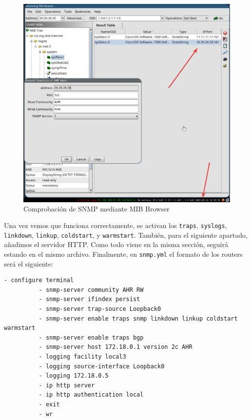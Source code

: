 \documentclass[11pt]{article}
\begin{document}
\begin{figure}[h]
    \centering
    \includegraphics[width=\textwidth]{src/snmpgets.png}
    \caption{Comprobación de SNMP mediante MIB Browser}
\end{figure}

Una vez vemos que funciona correctamente, se activan los \texttt{traps}, \texttt{syslogs}, \mbox{\texttt{linkdown}}, \mbox{\texttt{linkup}}, \mbox{\texttt{coldstart}}, y \mbox{\texttt{warmstart}}. También, para el siguiente apartado, añadimos el servidor HTTP. Como todo viene en la misma sección, seguirá estando en el mismo archivo. Finalmente, en \texttt{snmp.yml} el formato de los routers será el siguiente:

\begin{tcolorbox}[
    boxrule=0pt,
    title= traps syslog y HTTP en el archivo snmp.yml, 
]
    \begin{lstlisting}[gobble=10]
          - configure terminal
          - snmp-server community AHR RW
          - snmp-server ifindex persist
          - snmp-server trap-source Loopback0
          - snmp-server enable traps snmp linkdown linkup coldstart warmstart
          - snmp-server enable traps bgp
          - snmp-server host 172.18.0.1 version 2c AHR 
          - logging facility local3
          - logging source-interface Loopback0
          - logging 172.18.0.5
          - ip http server
          - ip http authentication local
          - exit
          - wr
    \end{lstlisting}
\end{tcolorbox}
\end{document}
